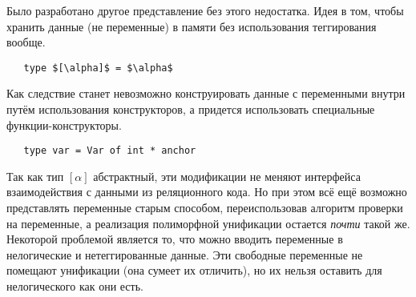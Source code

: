 
Было разработано другое представление без этого недостатка.
Идея в том, чтобы хранить данные (не переменные) в памяти без использования теггирования вообще.

\begin{lstlisting}
   type $[\alpha]$ = $\alpha$
\end{lstlisting}

\noindent Как следствие станет невозможно конструировать данные с переменными внутри путём использования конструкторов,
а придется использовать специальные функции-конструк\-торы.


\begin{lstlisting}
   type var = Var of int * anchor
\end{lstlisting}

\noindent Так как тип $[\alpha]$ абстрактный, эти модификации не меняют интерфейса взаимодействия с данными из реляционного кода.
Но при этом всё ещё возможно представлять переменные старым способом, переиспользовав алгоритм проверки на переменные,
а реализация полиморфной унификации остается \emph{почти} такой же.
Некоторой проблемой является то, что можно вводить переменные в нелогические и нетеггированные данные.
Эти свободные переменные не помещают унификации (она сумеет их отличить), но их нельзя оставить для нелогического как они есть.


